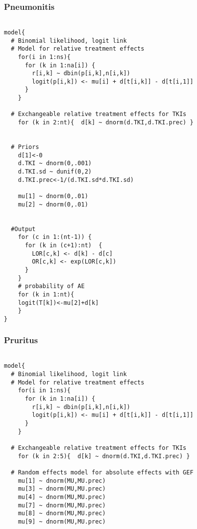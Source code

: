 \documentclass[11pt,final,fleqn]{article}\usepackage[]{graphicx}\usepackage[]{color}
\theoremstyle{plain}
\begin{document}
\begin{appendices}
\begin{verbatim}
\end{verbatim}

\subsubsection{Pneumonitis} 
\begin{verbatim} 

model{
  # Binomial likelihood, logit link
  # Model for relative treatment effects
    for(i in 1:ns){                  
      for (k in 1:na[i]) {               
        r[i,k] ~ dbin(p[i,k],n[i,k])     
        logit(p[i,k]) <- mu[i] + d[t[i,k]] - d[t[i,1]]  
      }
    }   
  
  # Exchangeable relative treatment effects for TKIs
    for (k in 2:nt){  d[k] ~ dnorm(d.TKI,d.TKI.prec) }
  
       
  # Priors
    d[1]<-0                                      
    d.TKI ~ dnorm(0,.001)
    d.TKI.sd ~ dunif(0,2) 
    d.TKI.prec<-1/(d.TKI.sd*d.TKI.sd)
      
    mu[1] ~ dnorm(0,.01)                         
    mu[2] ~ dnorm(0,.01)
    
      
  #Output                                     
    for (c in 1:(nt-1)) {                        
      for (k in (c+1):nt)  { 
        LOR[c,k] <- d[k] - d[c]
        OR[c,k] <- exp(LOR[c,k])
      }  
    }
    # probability of AE
    for (k in 1:nt){ 
    logit(T[k])<-mu[2]+d[k]
    }
}

\end{verbatim}

\subsubsection{Pruritus} 
\begin{verbatim} 

model{
  # Binomial likelihood, logit link
  # Model for relative treatment effects
    for(i in 1:ns){                  
      for (k in 1:na[i]) {               
        r[i,k] ~ dbin(p[i,k],n[i,k])     
        logit(p[i,k]) <- mu[i] + d[t[i,k]] - d[t[i,1]]  
      }
    }   
      
  # Exchangeable relative treatment effects for TKIs
    for (k in 2:5){  d[k] ~ dnorm(d.TKI,d.TKI.prec) }
  
  # Random effects model for absolute effects with GEF
    mu[1] ~ dnorm(MU,MU.prec) 
    mu[3] ~ dnorm(MU,MU.prec) 
    mu[4] ~ dnorm(MU,MU.prec)
    mu[7] ~ dnorm(MU,MU.prec)
    mu[8] ~ dnorm(MU,MU.prec) 
    mu[9] ~ dnorm(MU,MU.prec) 
       

\end{verbatim}
\end{appendices}
\end{document}
